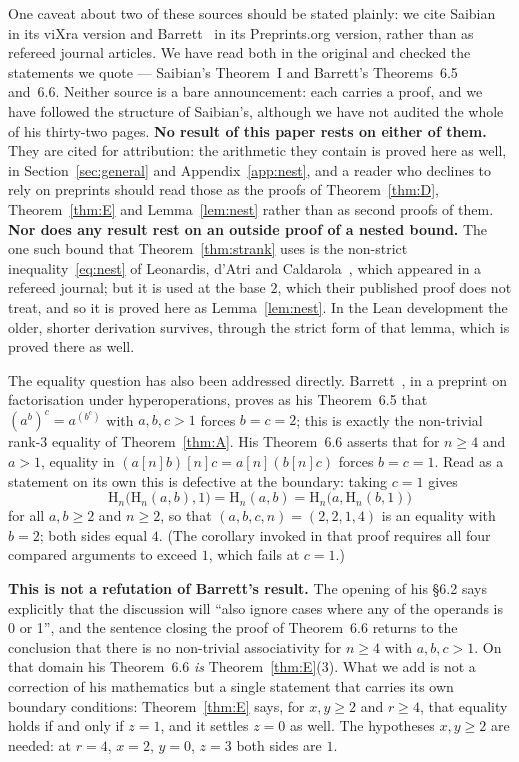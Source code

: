 \documentclass[11pt,a4paper]{article}
\theoremstyle{plain}
\theoremstyle{definition}
\newcommand{\HH}{\mathrm{H}}
\begin{document}
One caveat about two of these sources should be stated plainly: we cite
Saibian~\cite{Sai} in its viXra version and Barrett~\cite{Bar} in its Preprints.org
version, rather than as refereed journal articles.
We have read both in the original and checked the statements we quote --- Saibian's
Theorem~I and Barrett's Theorems~6.5 and~6.6. Neither source is a bare announcement:
each carries a proof, and we have followed the structure of Saibian's, although we have
not audited the whole of his thirty-two pages. \textbf{No result of this paper rests on
either of them.} They are cited for attribution: the arithmetic they contain is proved
here as well, in Section~\ref{sec:general} and Appendix~\ref{app:nest}, and a reader who
declines to rely on preprints should read those as the proofs of Theorem~\ref{thm:D},
Theorem~\ref{thm:E} and Lemma~\ref{lem:nest} rather than as second proofs of them.
\textbf{Nor does any result rest on an outside proof of a nested bound.} The one such
bound that Theorem~\ref{thm:strank} uses is the non-strict inequality~\eqref{eq:nest}
of Leonardis, d'Atri and Caldarola~\cite{LdC}, which appeared in a refereed journal; but
it is used at the base $2$, which their published proof does not treat, and so it is
proved here as Lemma~\ref{lem:nest}. In the Lean development the older, shorter
derivation survives, through the strict form of that lemma, which is proved there as
well.

The equality question has also been addressed directly. Barrett~\cite{Bar}, in a
preprint on factorisation under hyperoperations, proves as his Theorem~6.5 that
$(a^{b})^{c}=a^{(b^{c})}$ with $a,b,c>1$ forces $b=c=2$; this is exactly the
non-trivial rank-$3$ equality of Theorem~\ref{thm:A}. His Theorem~6.6 asserts that
for $n\ge4$ and $a>1$, equality in $(a[n]b)[n]c=a[n](b[n]c)$ forces $b=c=1$. Read as a
statement on its own this is defective at the boundary: taking $c=1$ gives
\[
  \HH_n\bigl(\HH_n(a,b),1\bigr)=\HH_n(a,b)=\HH_n\bigl(a,\HH_n(b,1)\bigr)
\]
for all $a,b\ge2$ and $n\ge2$, so that $(a,b,c,n)=(2,2,1,4)$ is an equality with
$b=2$; both sides equal $4$. (The corollary invoked in that proof requires all four
compared arguments to exceed $1$, which fails at $c=1$.)

\textbf{This is not a refutation of Barrett's result.} The opening of his
\S6.2 says explicitly that the discussion will ``also ignore cases where any of the
operands is 0 or 1'', and the sentence closing the proof of Theorem~6.6 returns to the
conclusion that there is no non-trivial associativity for $n\ge4$ with $a,b,c>1$. On
that domain his Theorem~6.6 \emph{is} Theorem~\ref{thm:E}(3). What we add is not a
correction of his mathematics but a single statement that carries its own boundary
conditions: Theorem~\ref{thm:E} says, for $x,y\ge2$ and $r\ge4$, that equality holds
if and only if $z=1$, and it settles $z=0$ as well. The hypotheses $x,y\ge2$ are needed:
at $r=4$, $x=2$, $y=0$, $z=3$ both sides are $1$.
\end{document}
